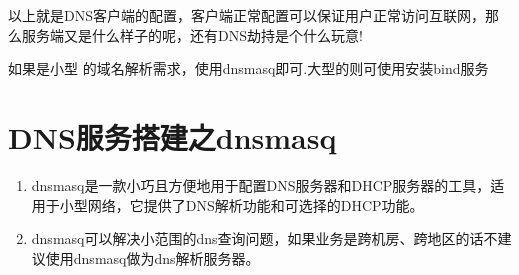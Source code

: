 以上就是DNS客户端的配置，客户端正常配置可以保证用户正常访问互联网，那么服务端又是什么样子的呢，还有DNS劫持是个什么玩意!

如果是小型 的域名解析需求，使用dnsmasq即可.大型的则可使用安装bind服务 
\section{DNS服务搭建之dnsmasq}
\begin{enumerate}
\item dnsmasq是一款小巧且方便地用于配置DNS服务器和DHCP服务器的工具，适用于小型网络，它提供了DNS解析功能和可选择的DHCP功能。 
\item dnsmasq可以解决小范围的dns查询问题，如果业务是跨机房、跨地区的话不建议使用dnsmasq做为dns解析服务器。
\end{enumerate}

